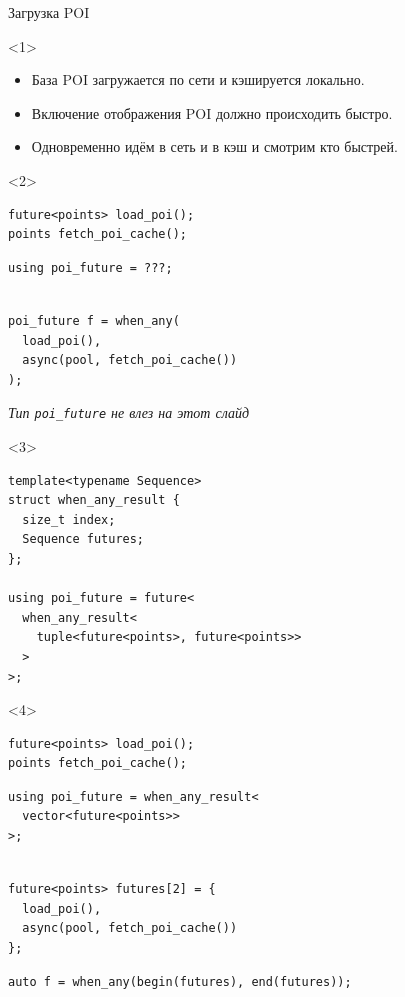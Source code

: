 \documentclass[aspectratio=169,hyperref={unicode},17pt]{beamer}
\begin{document}
\begin{frame}[fragile,t]{Загрузка POI}
\begin{onlyenv}<1>
\begin{itemize}
 \item База POI загружается по сети и кэшируется локально.
 \item Включение отображения POI должно происходить быстро.
 \item Одновременно идём в сеть и в кэш и смотрим кто быстрей.
\end{itemize}
\end{onlyenv}
\begin{onlyenv}<2>
\begin{lstlisting}[style=cppcode,belowskip=0pt]
future<points> load_poi();
points fetch_poi_cache();
\end{lstlisting}
\begin{lstlisting}[style=cppcode,backgroundcolor=\color{gray!30},aboveskip=0pt,belowskip=0pt]
using poi_future = ???;
\end{lstlisting}
\begin{lstlisting}[style=cppcode,aboveskip=0pt,belowskip=0pt]

poi_future f = when_any(
  load_poi(),
  async(pool, fetch_poi_cache())
);
\end{lstlisting}
\textit{\footnotesize{Тип \texttt{poi\_future} не влез на этот слайд}}
\end{onlyenv}
\begin{onlyenv}<3>
\begin{lstlisting}[style=cppcode]
template<typename Sequence>
struct when_any_result {
  size_t index;
  Sequence futures;
};

using poi_future = future<
  when_any_result<
    tuple<future<points>, future<points>>
  >
>;
\end{lstlisting}
\end{onlyenv}
\begin{onlyenv}<4>
\begin{lstlisting}[style=cppcode,belowskip=0pt]
future<points> load_poi();
points fetch_poi_cache();
\end{lstlisting}
\begin{lstlisting}[style=cppcode,backgroundcolor=\color{gray!30},aboveskip=0pt,belowskip=0pt]
using poi_future = when_any_result<
  vector<future<points>>
>;
\end{lstlisting}
\begin{lstlisting}[style=cppcode,aboveskip=0pt,belowskip=0pt]

future<points> futures[2] = {
  load_poi(),
  async(pool, fetch_poi_cache())
};
\end{lstlisting}
\begin{lstlisting}[style=cppcode,backgroundcolor=\color{gray!30},aboveskip=0pt]
auto f = when_any(begin(futures), end(futures));
\end{lstlisting}
\end{onlyenv}
\end{frame}
\end{document}
